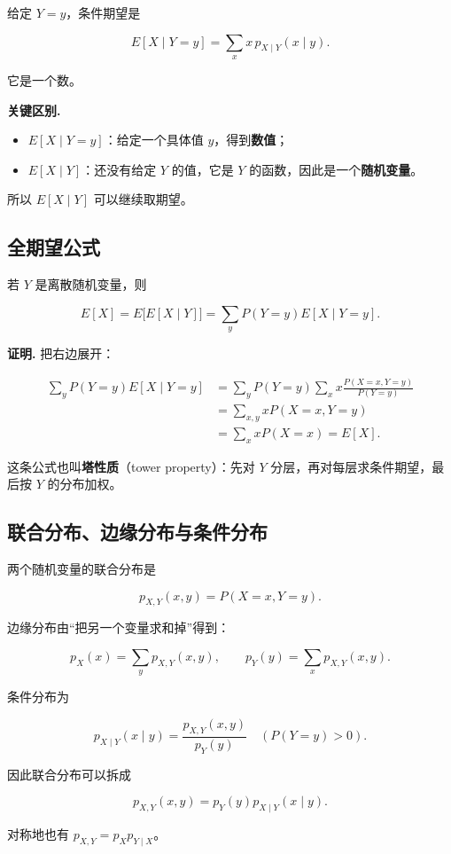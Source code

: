 给定 $Y=y$，条件期望是

\[
E[X\mid Y=y]=\sum_x x\,p_{X\mid Y}(x\mid y).
\]

它是一个数。

\textbf{关键区别.}

\begin{itemize}
\item $E[X\mid Y=y]$：给定一个具体值 $y$，得到\textbf{数值}；
\item $E[X\mid Y]$：还没有给定 $Y$ 的值，它是 $Y$ 的函数，因此是一个\textbf{随机变量}。
\end{itemize}


所以 $E[X\mid Y]$ 可以继续取期望。

\subsection{全期望公式}


若 $Y$ 是离散随机变量，则

\[
E[X]=E\bigl[E[X\mid Y]\bigr]
=\sum_y P(Y=y)E[X\mid Y=y].
\]

\textbf{证明.} 把右边展开：

\[
\begin{aligned}
\sum_y P(Y=y)E[X\mid Y=y]
&=\sum_y P(Y=y)\sum_x x\frac{P(X=x,Y=y)}{P(Y=y)}\\
&=\sum_{x,y}xP(X=x,Y=y)\\
&=\sum_x xP(X=x)=E[X].
\end{aligned}
\]

这条公式也叫\textbf{塔性质}（tower property）：先对 $Y$ 分层，再对每层求条件期望，最后按 $Y$ 的分布加权。

\subsection{联合分布、边缘分布与条件分布}


两个随机变量的联合分布是

\[
p_{X,Y}(x,y)=P(X=x,Y=y).
\]

边缘分布由“把另一个变量求和掉”得到：

\[
p_X(x)=\sum_y p_{X,Y}(x,y),\qquad
p_Y(y)=\sum_x p_{X,Y}(x,y).
\]

条件分布为

\[
p_{X\mid Y}(x\mid y)=\frac{p_{X,Y}(x,y)}{p_Y(y)}
\quad(P(Y=y)>0).
\]

因此联合分布可以拆成

\[
p_{X,Y}(x,y)=p_Y(y)p_{X\mid Y}(x\mid y).
\]

对称地也有 $p_{X,Y}=p_Xp_{Y\mid X}$。

